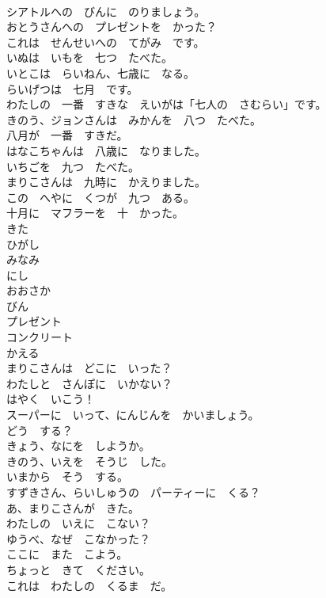 \documentclass[8pt]{extreport}
\begin{document}
\begin{CJK}{UTF8}{min}
\\	シアトルへの　びんに　のりましょう。	
\\	おとうさんへの　プレゼントを　かった？	
\\	これは　せんせいへの　てがみ　です。	
\\	いぬは　いもを　七つ　たべた。	
\\	いとこは　らいねん、七歳に　なる。	
\\	らいげつは　七月　です。	
\\	わたしの　一番　すきな　えいがは「七人の　さむらい」です。	
\\	きのう、ジョンさんは　みかんを　八つ　たべた。	
\\	八月が　一番　すきだ。	
\\	はなこちゃんは　八歳に　なりました。	
\\	いちごを　九つ　たべた。	
\\	まりこさんは　九時に　かえりました。	
\\	この　へやに　くつが　九つ　ある。	
\\	十月に　マフラーを　十　かった。	
\\	きた	
\\	ひがし	
\\	みなみ	
\\	にし	
\\	おおさか	
\\	びん	
\\	プレゼント	
\\	コンクリート	
\\	かえる	
\\	まりこさんは　どこに　いった？	
\\	わたしと　さんぽに　いかない？	
\\	はやく　いこう！	
\\	スーパーに　いって、にんじんを　かいましょう。	
\\	どう　する？	
\\	きょう、なにを　しようか。	
\\	きのう、いえを　そうじ　した。	
\\	いまから　そう　する。	
\\	すずきさん、らいしゅうの　パーティーに　くる？	
\\	あ、まりこさんが　きた。	
\\	わたしの　いえに　こない？	
\\	ゆうべ、なぜ　こなかった？	
\\	ここに　また　こよう。	
\\	ちょっと　きて　ください。	
\\	これは　わたしの　くるま　だ。	

\end{CJK}
\end{document}
